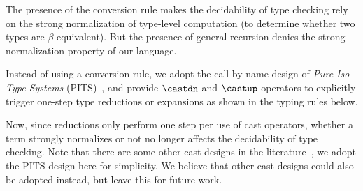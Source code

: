\noindent The presence of the conversion rule makes the decidability of
type checking rely on the strong normalization of type-level computation
(to determine whether two types are $\beta$-equivalent).
But the presence of general recursion denies the strong normalization property
of our language.

Instead of using a conversion rule, we adopt the call-by-name design of
\emph{Pure Iso-Type Systems} (PITS)~\citep{isotype,yang2019pure},
and provide $\castdn$ and $\castup$ operators to explicitly trigger one-step
type reductions or expansions as shown in the typing rules below.

\noindent Now, since reductions only perform one step per use of cast
operators, whether a term strongly normalizes or not no longer affects the
decidability of type checking.
Note that there are some other cast designs in the
literature~\citep{guru,sjoberg:msfp12, kimmel:plpv, zombie:popl15},
we adopt the PITS design here for simplicity. We believe that other cast
designs could also be adopted instead, but leave this for future work.
